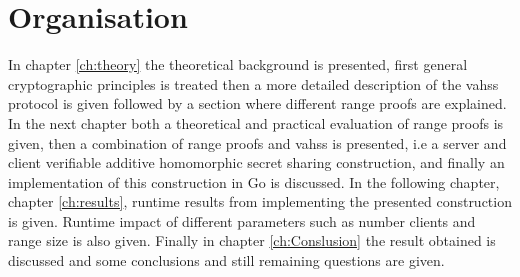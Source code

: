 \section*{Organisation}
In chapter \ref{ch:theory} the theoretical background is presented, first general cryptographic principles is treated then a more detailed description of the vahss protocol is given followed by a section where different range proofs are explained. In the next chapter both a theoretical and practical evaluation of range proofs is given, then a combination of range proofs and vahss is presented, i.e a server and client verifiable additive homomorphic secret sharing construction, and finally an implementation of this construction in Go is discussed. In the following chapter, chapter  \ref{ch:results}, runtime results from implementing the presented construction is given. Runtime impact of different parameters such as number clients and range size is also given. Finally in chapter  \ref{ch:Conslusion} the result obtained is discussed and some conclusions and still remaining questions are given. 


